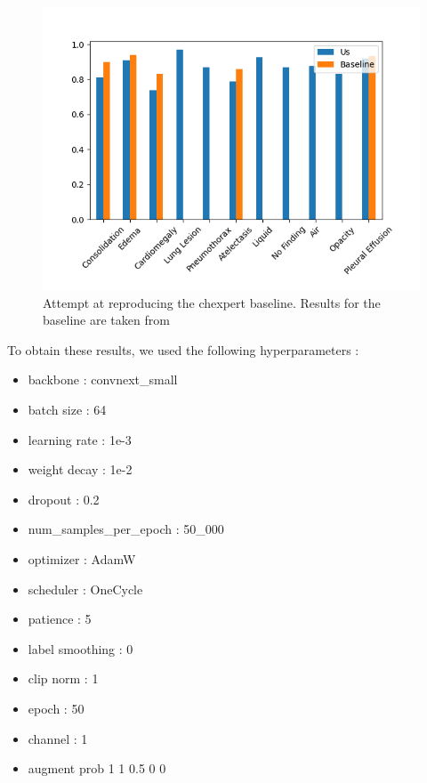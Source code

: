 \documentclass[11pt]{article}
\begin{document}
        \begin{figure}[h!]

             \centering
             \includegraphics[width=0.8 \textwidth]{plots/chexpert_baseline_blue+comparison}
             \caption{Attempt at reproducing the chexpert baseline. Results for the baseline are taken from \cite{chexpert}}
             \label{fig:CheXpert_baseline}

        \end{figure}

        To obtain these results, we used the following hyperparameters :

        \begin{itemize}
            \item backbone : convnext\_small
            \item batch size : 64
            \item learning rate : 1e-3
            \item weight decay : 1e-2
            \item dropout : 0.2
            \item num\_samples\_per\_epoch : 50\_000
            \item optimizer : AdamW
            \item scheduler : OneCycle
            \item patience : 5
            \item label smoothing : 0
            \item clip norm : 1
            \item epoch : 50
            \item channel : 1
            \item augment prob 1 1 0.5 0 0 %
        \end{itemize}
\end{document}
